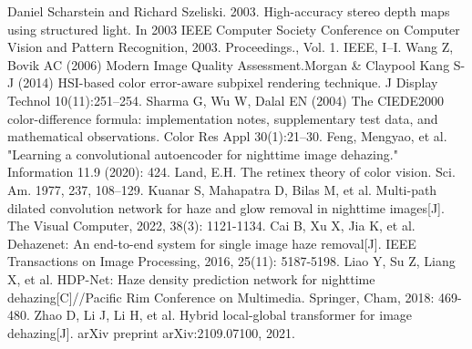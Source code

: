 \begin{multicols}{2}
\begin{thebibliography}{9}
	Daniel Scharstein and Richard Szeliski. 2003. High-accuracy stereo depth maps using structured light. In 2003 IEEE Computer Society Conference on Computer Vision and Pattern Recognition, 2003. Proceedings., Vol. 1. IEEE, I–I.
	Wang Z, Bovik AC (2006) Modern Image Quality Assessment.Morgan \& Claypool
	Kang S-J (2014) HSI-based color error-aware subpixel rendering technique. J Display Technol 10(11):251–254.
	Sharma G, Wu W, Dalal EN (2004) The CIEDE2000 color-difference formula: implementation notes, supplementary test data, and mathematical observations. Color Res Appl 30(1):21–30.
	Feng, Mengyao, et al. "Learning a convolutional autoencoder for nighttime image dehazing." Information 11.9 (2020): 424.
	Land, E.H. The retinex theory of color vision. Sci. Am. 1977, 237, 108–129.
	Kuanar S, Mahapatra D, Bilas M, et al. Multi-path dilated convolution network for haze and glow removal in nighttime images[J]. The Visual Computer, 2022, 38(3): 1121-1134.
	Cai B, Xu X, Jia K, et al. Dehazenet: An end-to-end system for single image haze removal[J]. IEEE Transactions on Image Processing, 2016, 25(11): 5187-5198.
	Liao Y, Su Z, Liang X, et al. HDP-Net: Haze density prediction network for nighttime dehazing[C]//Pacific Rim Conference on Multimedia. Springer, Cham, 2018: 469-480.
	Zhao D, Li J, Li H, et al. Hybrid local-global transformer for image dehazing[J]. arXiv preprint arXiv:2109.07100, 2021.

\end{thebibliography}
\end{multicols}